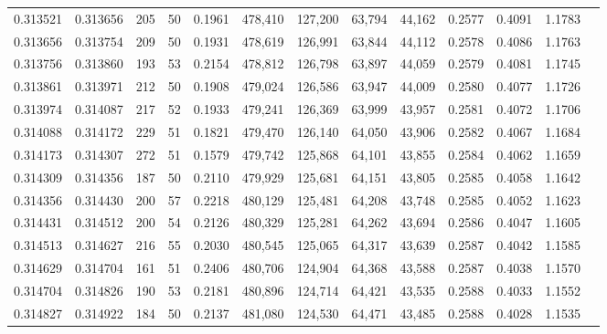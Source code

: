 \begin{tabular}{rrrrrrrrrrrrr}
0.313521 & 0.313656 &   205 &  50 &                                     0.1961 & 478,410 & 127,200 &  63,794 &  44,162 & 0.2577 & 0.4091 & 1.1783 \\
0.313656 & 0.313754 &   209 &  50 &                                     0.1931 & 478,619 & 126,991 &  63,844 &  44,112 & 0.2578 & 0.4086 & 1.1763 \\
0.313756 & 0.313860 &   193 &  53 &                                     0.2154 & 478,812 & 126,798 &  63,897 &  44,059 & 0.2579 & 0.4081 & 1.1745 \\
0.313861 & 0.313971 &   212 &  50 &                                     0.1908 & 479,024 & 126,586 &  63,947 &  44,009 & 0.2580 & 0.4077 & 1.1726 \\
0.313974 & 0.314087 &   217 &  52 &                                     0.1933 & 479,241 & 126,369 &  63,999 &  43,957 & 0.2581 & 0.4072 & 1.1706 \\
0.314088 & 0.314172 &   229 &  51 &                                     0.1821 & 479,470 & 126,140 &  64,050 &  43,906 & 0.2582 & 0.4067 & 1.1684 \\
0.314173 & 0.314307 &   272 &  51 &                                     0.1579 & 479,742 & 125,868 &  64,101 &  43,855 & 0.2584 & 0.4062 & 1.1659 \\
0.314309 & 0.314356 &   187 &  50 &                                     0.2110 & 479,929 & 125,681 &  64,151 &  43,805 & 0.2585 & 0.4058 & 1.1642 \\
0.314356 & 0.314430 &   200 &  57 &                                     0.2218 & 480,129 & 125,481 &  64,208 &  43,748 & 0.2585 & 0.4052 & 1.1623 \\
0.314431 & 0.314512 &   200 &  54 &                                     0.2126 & 480,329 & 125,281 &  64,262 &  43,694 & 0.2586 & 0.4047 & 1.1605 \\
0.314513 & 0.314627 &   216 &  55 &                                     0.2030 & 480,545 & 125,065 &  64,317 &  43,639 & 0.2587 & 0.4042 & 1.1585 \\
0.314629 & 0.314704 &   161 &  51 &                                     0.2406 & 480,706 & 124,904 &  64,368 &  43,588 & 0.2587 & 0.4038 & 1.1570 \\
0.314704 & 0.314826 &   190 &  53 &                                     0.2181 & 480,896 & 124,714 &  64,421 &  43,535 & 0.2588 & 0.4033 & 1.1552 \\
0.314827 & 0.314922 &   184 &  50 &                                     0.2137 & 481,080 & 124,530 &  64,471 &  43,485 & 0.2588 & 0.4028 & 1.1535 \\

\end{tabular}
